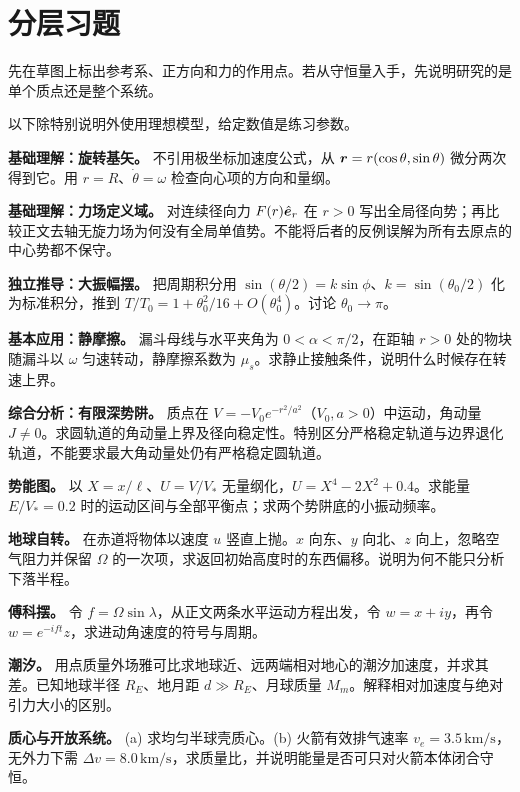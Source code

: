 \section*{分层习题}
先在草图上标出参考系、正方向和力的作用点。若从守恒量入手，先说明研究的是单个质点还是整个系统。

以下除特别说明外使用理想模型，给定数值是练习参数。
\begin{bookexercises}
\item {} \textbf{基础理解：旋转基矢。} 不引用极坐标加速度公式，从 $\boldsymbol{r}=r(\cos\theta,\sin\theta)$ 微分两次得到它。用 $r=R$、$\dot\theta=\omega$ 检查向心项的方向和量纲。
\item {} \textbf{基础理解：力场定义域。} 对连续径向力 $F(r)\hat{\boldsymbol{e}}_r$ 在 $r>0$ 写出全局径向势；再比较正文去轴无旋力场为何没有全局单值势。不能将后者的反例误解为所有去原点的中心势都不保守。
\item {} \textbf{独立推导：大振幅摆。} 把周期积分用 $\sin(\theta/2)=k\sin\phi$、$k=\sin(\theta_0/2)$ 化为标准积分，推到 $T/T_0=1+\theta_0^2/16+O(\theta_0^4)$。讨论 $\theta_0\to\pi$。
\item {} \textbf{基本应用：静摩擦。} 漏斗母线与水平夹角为 $0<\alpha<\pi/2$，在距轴 $r>0$ 处的物块随漏斗以 $\omega$ 匀速转动，静摩擦系数为 $\mu_s$。求静止接触条件，说明什么时候存在转速上界。
\item {} \textbf{综合分析：有限深势阱。} 质点在 $V=-V_0e^{-r^2/a^2}$（$V_0,a>0$）中运动，角动量 $J\ne0$。求圆轨道的角动量上界及径向稳定性。特别区分严格稳定轨道与边界退化轨道，不能要求最大角动量处仍有严格稳定圆轨道。
\item {} \textbf{势能图。} 以 $X=x/\ell$、$U=V/V_*$ 无量纲化，$U=X^4-2X^2+0.4$。求能量 $E/V_*=0.2$ 时的运动区间与全部平衡点；求两个势阱底的小振动频率。
\item {} \textbf{地球自转。} 在赤道将物体以速度 $u$ 竖直上抛。$x$ 向东、$y$ 向北、$z$ 向上，忽略空气阻力并保留 $\Omega$ 的一次项，求返回初始高度时的东西偏移。说明为何不能只分析下落半程。
\item {} \textbf{傅科摆。} 令 $f=\Omega\sin\lambda$，从正文两条水平运动方程出发，令 $w=x+iy$，再令 $w=e^{-ift}z$，求进动角速度的符号与周期。
\item {} \textbf{潮汐。} 用点质量外场雅可比求地球近、远两端相对地心的潮汐加速度，并求其差。已知地球半径 $R_E$、地月距 $d\gg R_E$、月球质量 $M_m$。解释相对加速度与绝对引力大小的区别。
\item {} \textbf{质心与开放系统。} (a) 求均匀半球壳质心。(b) 火箭有效排气速率 $v_e=3.5\,\mathrm{km/s}$，无外力下需 $\Delta v=8.0\,\mathrm{km/s}$，求质量比，并说明能量是否可只对火箭本体闭合守恒。

\end{bookexercises}
